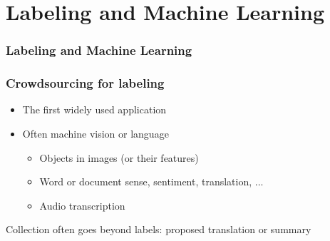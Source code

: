 \documentclass[slides]{beamer} %
\begin{document}
\section{Labeling and Machine Learning}

\begin{frame}\frametitle{Labeling and Machine Learning}


\end{frame}

\begin{frame}\frametitle{Crowdsourcing for labeling}

\begin{itemize}
\item The first widely used application
\item Often machine vision or language
\begin{itemize}
\item Objects in images (or their features)
\item Word or document sense, sentiment, translation, ...
\item Audio transcription
\end{itemize}
\end{itemize}

Collection often goes beyond labels: proposed translation or summary

\end{frame}
\end{document}
